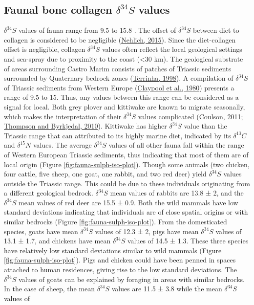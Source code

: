 \documentclass[preprint, 3p, authoryear]{elsarticle} %
\begin{document}
\hypertarget{sulphur}{%
\subsection{\texorpdfstring{Faunal bone collagen \(\delta ^{34}S\) values}{Faunal bone collagen \textbackslash delta \^{}\{34\}S values}}\label{sulphur}}

\(\delta ^{34}S\) values of fauna range from 9.5 \text{\textperthousand} to 15.8 \text{\textperthousand}. The offset of \(\delta ^{34}S\) between diet to collagen is considered to be negligible (\protect\hyperlink{ref-nehlich15}{Nehlich, 2015}). Since the diet-collagen offset is negligible, collagen \(\delta ^{34}S\) values often reflect the local geological settings and sea-spray due to proximity to the coast (\textless30 km). The geological substrate of areas surrounding Castro Marim consists of patches of Triassic sediments surrounded by Quaternary bedrock zones (\protect\hyperlink{ref-terrinha98}{Terrinha, 1998}). A compilation of \(\delta ^{34}S\) of Triassic sediments from Western Europe (\protect\hyperlink{ref-claypool_etal80}{Claypool et al., 1980}) presents a range of 9.5\text{\textperthousand} to 15\text{\textperthousand}. Thus, any values between this range can be considered as a signal for local. Both grey plover and kittiwake are known to migrate seasonally, which makes the interpretation of their \(\delta ^{34}S\) values complicated (\protect\hyperlink{ref-coulson11}{Coulson, 2011}; \protect\hyperlink{ref-thompsonbyrkjedal10}{Thompson and Byrkjedal, 2010}). Kittiwake has higher \(\delta ^{34}S\) value than the Triassic range that can attributed to its highly marine diet, indicated by its \(\delta ^{13}C\) and \(\delta ^{15}N\) values. The average \(\delta ^{34}S\) values of all other fauna fall within the range of Western European Triassic sediments, thus indicating that most of them are of local origin (Figure \ref{fig:fauna-sulph-iso-plot}). Though some animals (two chicken, four cattle, five sheep, one goat, one rabbit, and two red deer) yield \(\delta ^{34}S\) values outside the Triassic range. This could be due to these individuals originating from a different geological bedrock. \(\delta ^{34}S\) mean values of rabbits are 13.8 ± 2\text{\textperthousand}, and the \(\delta ^{34}S\) mean values of red deer are 15.5 ± 0.9\text{\textperthousand}. Both the wild mammals have low standard deviations indicating that individuals are of close spatial origins or with similar bedrocks (Figure \ref{fig:fauna-sulph-iso-plot}). From the domesticated species, goats have mean \(\delta ^{34}S\) values of 12.3 ± 2\text{\textperthousand}, pigs have mean \(\delta ^{34}S\) values of 13.1 ± 1.7\text{\textperthousand}, and chickens have mean \(\delta ^{34}S\) values of 14.5 ± 1.3\text{\textperthousand}. These three species have relatively low standard deviations similar to wild mammals (Figure \ref{fig:fauna-sulph-iso-plot}). Pigs and chicken could have been penned in spaces attached to human residences, giving rise to the low standard deviations. The \(\delta ^{34}S\) values of goats can be explained by foraging in areas with similar bedrocks. In the case of sheep, the mean \(\delta ^{34}S\) values are 11.5 ± 3.8\text{\textperthousand} while the mean \(\delta ^{34}S\) values of 
\end{document}
